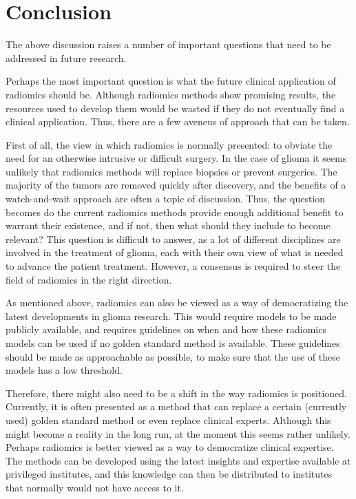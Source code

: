 \section{Conclusion}\label{sec:discussion_conclusion}


The above discussion raises a number of important questions that need to be addressed in future research.

Perhaps the most important question is what the future clinical application of radiomics should be.
Although radiomics methods show promising results, the resources used to develop them would be wasted if they do not eventually find a clinical application.
Thus, there are a few aveneus of approach that can be taken.

First of all, the view in which radiomics is normally presented: to obviate the need for an otherwise intrusive or difficult surgery.
In the case of glioma it seems unlikely that radiomics methods will replace biopsies or prevent surgeries.
The majority of the \glspl{tumor} are removed quickly after discovery, and the benefits of a watch-and-wait approach are often a topic of discussion.
Thus, the question becomes do the current radiomics methods provide enough additional benefit to warrant their existence, and if not, then what should they include to become relevant?
This question is difficult to answer, as a lot of different disciplines are involved in the treatment of glioma, each with their own view of what is needed to advance the patient treatment.
However, a consensus is required to steer the field of radiomics in the right direction.

As mentioned above, radiomics can also be viewed as a way of democratizing the latest  developments in glioma research.
This would require models to be made publicly available, and requires guidelines on when and how these radiomics models can be used if no golden standard method is available.
These guidelines should be made as approachable as possible, to make sure that the use of these models has a low threshold.


Therefore, there might also need to be a shift in the way radiomics is positioned.
Currently, it is often presented as a method that can replace a certain (currently used) golden standard method or even replace clinical experts.
Although this might become a reality in the long run, at the moment this seems rather unlikely.
Perhaps radiomics is better viewed as a way to democratize clinical expertise.
The methods can be developed using the latest insights and expertise available at privileged institutes, and this knowledge can then be distributed to institutes that normally would not have access to it.

